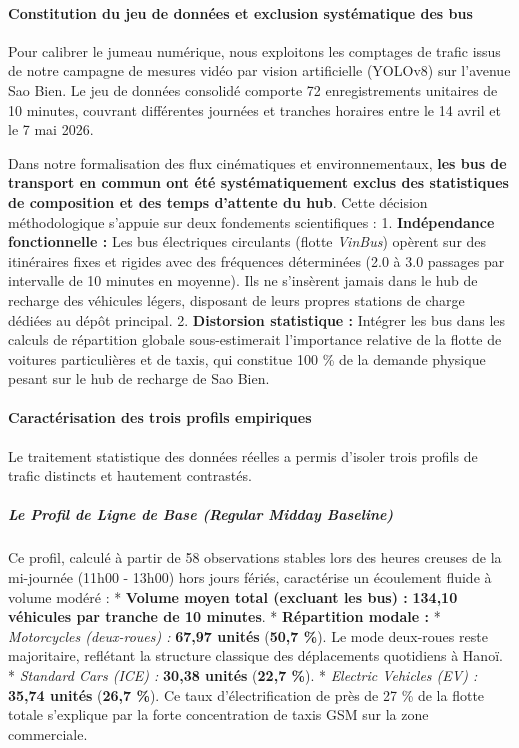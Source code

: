 \documentclass[10pt, a4paper]{article}
\begin{document}
\paragraph{Constitution du jeu de données et exclusion systématique des
bus}\label{constitution-du-jeu-de-donnuxe9es-et-exclusion-systuxe9matique-des-bus}

Pour calibrer le jumeau numérique, nous exploitons les comptages de
trafic issus de notre campagne de mesures vidéo par vision artificielle
(YOLOv8) sur l'avenue Sao Bien. Le jeu de données consolidé comporte 72
enregistrements unitaires de 10 minutes, couvrant différentes journées
et tranches horaires entre le 14 avril et le 7 mai 2026.

Dans notre formalisation des flux cinématiques et environnementaux,
\textbf{les bus de transport en commun ont été systématiquement exclus
des statistiques de composition et des temps d'attente du hub}. Cette
décision méthodologique s'appuie sur deux fondements scientifiques : 1.
\textbf{Indépendance fonctionnelle :} Les bus électriques circulants
(flotte \emph{VinBus}) opèrent sur des itinéraires fixes et rigides avec
des fréquences déterminées (2.0 à 3.0 passages par intervalle de 10
minutes en moyenne). Ils ne s'insèrent jamais dans le hub de recharge
des véhicules légers, disposant de leurs propres stations de charge
dédiées au dépôt principal. 2. \textbf{Distorsion statistique :}
Intégrer les bus dans les calculs de répartition globale sous-estimerait
l'importance relative de la flotte de voitures particulières et de
taxis, qui constitue 100 \% de la demande physique pesant sur le hub de
recharge de Sao Bien.

\paragraph{Caractérisation des trois profils
empiriques}\label{caractuxe9risation-des-trois-profils-empiriques}

Le traitement statistique des données réelles a permis d'isoler trois
profils de trafic distincts et hautement contrastés.

\subparagraph{Le Profil de Ligne de Base (Regular Midday
Baseline)}\label{le-profil-de-ligne-de-base-regular-midday-baseline}

Ce profil, calculé à partir de 58 observations stables lors des heures
creuses de la mi-journée (11h00 - 13h00) hors jours fériés, caractérise
un écoulement fluide à volume modéré : * \textbf{Volume moyen total
(excluant les bus) :} \textbf{134,10 véhicules par tranche de 10
minutes}. * \textbf{Répartition modale :} * \emph{Motorcycles
(deux-roues) :} \textbf{67,97 unités} (\textbf{50,7 \%}). Le mode
deux-roues reste majoritaire, reflétant la structure classique des
déplacements quotidiens à Hanoï. * \emph{Standard Cars (ICE) :}
\textbf{30,38 unités} (\textbf{22,7 \%}). * \emph{Electric Vehicles (EV)
:} \textbf{35,74 unités} (\textbf{26,7 \%}). Ce taux d'électrification
de près de 27 \% de la flotte totale s'explique par la forte
concentration de taxis GSM sur la zone commerciale.
\end{document}
